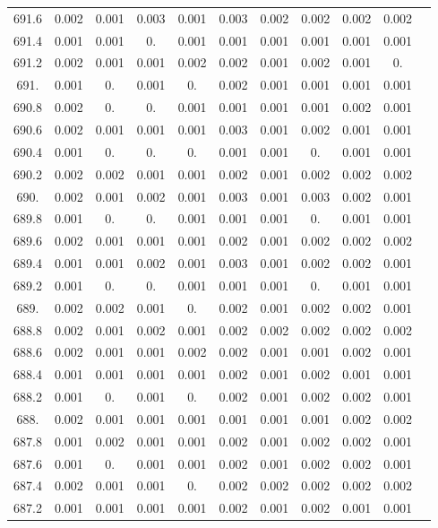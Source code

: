 \documentclass[12pt]{ctexart}
\numberwithin{equation}{section}
\begin{document}
\begin{longtable}{ccccccccccc}
691.6	&	0.002	&	0.001	&	0.003	&	0.001	&	0.003	&	0.002	&	0.002	&	0.002	&	0.002	\\
691.4	&	0.001	&	0.001	&	0.	&	0.001	&	0.001	&	0.001	&	0.001	&	0.001	&	0.001	\\
691.2	&	0.002	&	0.001	&	0.001	&	0.002	&	0.002	&	0.001	&	0.002	&	0.001	&	0.	\\
691.	&	0.001	&	0.	&	0.001	&	0.	&	0.002	&	0.001	&	0.001	&	0.001	&	0.001	\\
690.8	&	0.002	&	0.	&	0.	&	0.001	&	0.001	&	0.001	&	0.001	&	0.002	&	0.001	\\
690.6	&	0.002	&	0.001	&	0.001	&	0.001	&	0.003	&	0.001	&	0.002	&	0.001	&	0.001	\\
690.4	&	0.001	&	0.	&	0.	&	0.	&	0.001	&	0.001	&	0.	&	0.001	&	0.001	\\
690.2	&	0.002	&	0.002	&	0.001	&	0.001	&	0.002	&	0.001	&	0.002	&	0.002	&	0.002	\\
690.	&	0.002	&	0.001	&	0.002	&	0.001	&	0.003	&	0.001	&	0.003	&	0.002	&	0.001	\\
689.8	&	0.001	&	0.	&	0.	&	0.001	&	0.001	&	0.001	&	0.	&	0.001	&	0.001	\\
689.6	&	0.002	&	0.001	&	0.001	&	0.001	&	0.002	&	0.001	&	0.002	&	0.002	&	0.002	\\
689.4	&	0.001	&	0.001	&	0.002	&	0.001	&	0.003	&	0.001	&	0.002	&	0.002	&	0.001	\\
689.2	&	0.001	&	0.	&	0.	&	0.001	&	0.001	&	0.001	&	0.	&	0.001	&	0.001	\\
689.	&	0.002	&	0.002	&	0.001	&	0.	&	0.002	&	0.001	&	0.002	&	0.002	&	0.001	\\
688.8	&	0.002	&	0.001	&	0.002	&	0.001	&	0.002	&	0.002	&	0.002	&	0.002	&	0.002	\\
688.6	&	0.002	&	0.001	&	0.001	&	0.002	&	0.002	&	0.001	&	0.001	&	0.002	&	0.001	\\
688.4	&	0.001	&	0.001	&	0.001	&	0.001	&	0.002	&	0.001	&	0.002	&	0.001	&	0.001	\\
688.2	&	0.001	&	0.	&	0.001	&	0.	&	0.002	&	0.001	&	0.002	&	0.002	&	0.001	\\
688.	&	0.002	&	0.001	&	0.001	&	0.001	&	0.001	&	0.001	&	0.001	&	0.002	&	0.002	\\
687.8	&	0.001	&	0.002	&	0.001	&	0.001	&	0.002	&	0.001	&	0.002	&	0.002	&	0.001	\\
687.6	&	0.001	&	0.	&	0.001	&	0.001	&	0.002	&	0.001	&	0.002	&	0.002	&	0.001	\\
687.4	&	0.002	&	0.001	&	0.001	&	0.	&	0.002	&	0.002	&	0.002	&	0.002	&	0.002	\\
687.2	&	0.001	&	0.001	&	0.001	&	0.001	&	0.002	&	0.001	&	0.002	&	0.001	&	0.001	\\

\end{longtable}
\end{document}
